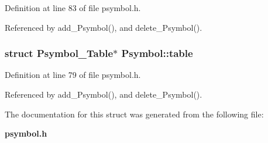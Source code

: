 Definition at line 83 of file psymbol.h.

Referenced by add\_\-Psymbol(), and delete\_\-Psymbol().
\subsubsection{\setlength{\rightskip}{0pt plus 5cm}struct \bf{Psymbol\_\-Table}$\ast$ \bf{Psymbol::table}}\label{structPsymbol_90ee72b6dc96db2d1c45ee084b1e1aa1}




Definition at line 79 of file psymbol.h.

Referenced by add\_\-Psymbol(), and delete\_\-Psymbol().

The documentation for this struct was generated from the following file:\begin{CompactItemize}
\item 
\bf{psymbol.h}\end{CompactItemize}
